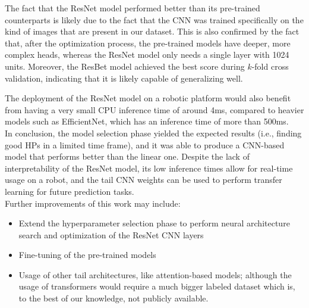 \noindent
The fact that the ResNet model performed better than its pre-trained counterparts is likely due to the fact that the CNN was trained specifically on the kind of images that are present in our dataset. This is also confirmed by the fact that, after the optimization process, the pre-trained models have deeper, more complex heads, whereas the ResNet model only needs a single layer with 1024 units. Moreover, the ResBet model achieved the best score during $k$-fold cross validation, indicating that it is likely capable of generalizing well.

The deployment of the ResNet model on a robotic platform would also benefit from having a very small CPU inference time of around 4ms, compared to heavier models such as EfficientNet, which has an inference time of more than 500ms.\\

\noindent
In conclusion, the model selection phase yielded the expected results (i.e., finding good HPs in a limited time frame), and it was able to produce a CNN-based model that performs better than the linear one. Despite the lack of interpretability of the ResNet model, its low inference times allow for real-time usage on a robot, and the tail CNN weights can be used to perform transfer learning for future prediction tasks.\\

\noindent
Further improvements of this work may include:

\begin{itemize}
    \item Extend the hyperparameter selection phase to perform neural architecture search and optimization of the ResNet CNN layers
    \item Fine-tuning of the pre-trained models
    \item Usage of other tail architectures, like attention-based models; although the usage of transformers would require a much bigger labeled dataset which is, to the best of our knowledge, not publicly available.  
\end{itemize}


